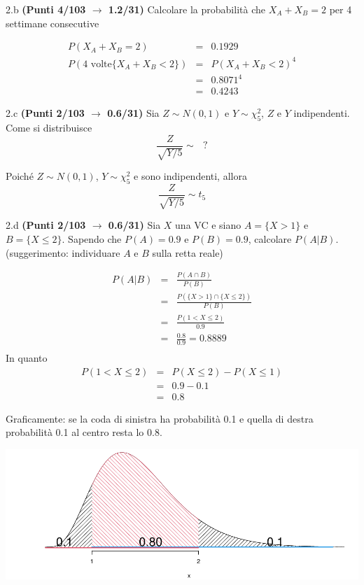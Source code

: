 \documentclass[
  11pt,
]{book}
\theoremstyle{mytheoremstyle}
\theoremstyle{mydefstyle}
\newenvironment{sol}
  {
  \begin{tcolorbox}[enhanced,breakable,arc=0.1mm,boxrule=1pt,colback=white,colframe=iblue,
  title=\bf \fontfamily{lmss}\selectfont \hspace{.5 cm} Soluzione,drop fuzzy shadow]

}{
\end{tcolorbox}
  }
\begin{document}
2.b \textbf{(Punti 4/103 \(\rightarrow\) 1.2/31)} Calcolare la probabilità che \(X_A + X_B= 2\) per 4 settimane consecutive

\begin{sol}
\begin{eqnarray*}
P(X_A + X_B = 2) &=& 0.1929\\
P(\text{4 volte}\{X_A + X_B < 2\}) &=& P(X_A + X_B < 2)^4\\
 &=& 0.8071^4\\
 &=& 0.4243
\end{eqnarray*}

\end{sol}

2.c \textbf{(Punti 2/103 \(\rightarrow\) 0.6/31)} Sia \(Z\sim N(0,1)\) e \(Y\sim \chi^2_5\), \(Z\) e \(Y\) indipendenti.
Come si distribuisce
\[
\frac{Z}{\sqrt{Y/5}}\sim~~~?
\]

\begin{sol}
Poiché \(Z \sim N(0,1)\), \(Y \sim \chi^2_5\) e sono indipendenti, allora
\[
\frac{Z}{\sqrt{Y/5}}\sim t_5
\]

\end{sol}

2.d \textbf{(Punti 2/103 \(\rightarrow\) 0.6/31)} Sia \(X\) una VC e siano \(A=\{X> 1\}\) e \(B=\{X \le 2\}\). Sapendo che
\(P(A)=0.9\) e \(P(B)=0.9\), calcolare \(P( A|  B)\). (suggerimento: individuare \(A\) e \(B\) sulla retta reale)

\begin{sol}

\begin{eqnarray*}
P(A|B) &=& \frac{P(A\cap B)}{P(B)}\\
       &=& \frac{P(\{X> 1\}\cap\{X \le 2\})}{P(B)}\\
       &=& \frac{P(1 < X \le 2)}{0.9}\\
       &=& \frac{0.8}{0.9}=0.8889\\
\end{eqnarray*}
In quanto
\begin{eqnarray*}
P(1 < X \le 2) &=& P(X \le 2) - P(X\le 1)\\
                      &=& 0.9-0.1\\
                      &=& 0.8
\end{eqnarray*}

Graficamente: se la coda di sinistra ha probabilità 0.1 e quella di destra probabilità 0.1 al centro resta lo 0.8.

\begin{center}\includegraphics{Esami_passati_con_soluzioni_files/figure-latex/unnamed-chunk-63-1} \end{center}

\end{sol}
\end{document}

